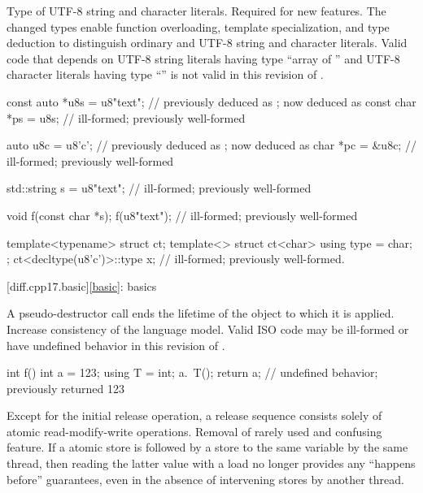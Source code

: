 %
\change
Type of UTF-8 string and character literals.
\rationale
Required for new features.
The changed types enable function overloading, template specialization, and
type deduction to distinguish ordinary and UTF-8 string and character literals.
\effect
Valid \CppXVII{} code that depends on
UTF-8 string literals having type ``array of '' and
UTF-8 character literals having type ``''
is not valid in this revision of \Cpp{}.
\begin{example}
\begin{codeblock}
const auto *u8s = u8"text";     //  previously deduced as ; now deduced as 
const char *ps = u8s;           // ill-formed; previously well-formed

auto u8c = u8'c';               //  previously deduced as ; now deduced as 
char *pc = &u8c;                // ill-formed; previously well-formed

std::string s = u8"text";       // ill-formed; previously well-formed

void f(const char *s);
f(u8"text");                    // ill-formed; previously well-formed

template<typename> struct ct;
template<> struct ct<char> {
  using type = char;
};
ct<decltype(u8'c')>::type x;    // ill-formed; previously well-formed.
\end{codeblock}
\end{example}

[diff.cpp17.basic]{\ref*{basic}: basics}

\change
A pseudo-destructor call ends the lifetime of
the object to which it is applied.
\rationale
Increase consistency of the language model.
\effect
Valid ISO \CppXVII{} code may be ill-formed or
have undefined behavior in this revision of \Cpp{}.
\begin{example}
\begin{codeblock}
int f() {
  int a = 123;
  using T = int;
  a.~T();
  return a;         // undefined behavior; previously returned 123
}
\end{codeblock}
\end{example}

\change
Except for the initial release operation,
a release sequence consists solely of atomic read-modify-write operations.
\rationale
Removal of rarely used and confusing feature.
\effect
If a  atomic store is followed
by a  store to the same variable by the same thread,
then reading the latter value with a  load
no longer provides any ``happens before'' guarantees,
even in the absence of intervening stores by another thread.

